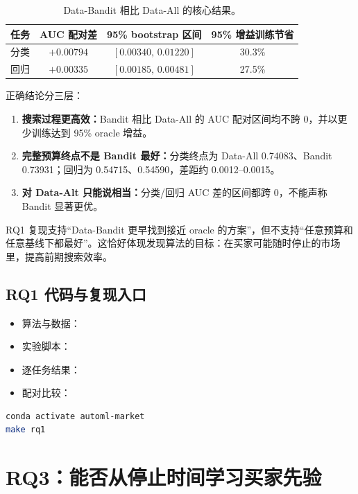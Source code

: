 \documentclass[11pt,a4paper]{ctexart}
\newcommand{\key}[1]{\textcolor{ZJUBlue}{\textbf{#1}}}
\newcommand{\good}[1]{\textcolor{ZJUGreen}{\textbf{#1}}}
\begin{document}
\begin{table}[H]
\centering
\caption{Data-Bandit 相比 Data-All 的核心结果。}
\begin{tabular}{lccc}
\toprule
任务 & AUC 配对差 & 95\% bootstrap 区间 & 95\% 增益训练节省\\
\midrule
分类 & $+0.00794$ & $[0.00340,\,0.01220]$ & 30.3\%\\
回归 & $+0.00335$ & $[0.00185,\,0.00481]$ & 27.5\%\\
\bottomrule
\end{tabular}
\end{table}

正确结论分三层：
\begin{enumerate}
  \item \good{搜索过程更高效：}Bandit 相比 Data-All 的 AUC 配对区间均不跨 0，并以更少训练达到 95\% oracle 增益。
  \item \key{完整预算终点不是 Bandit 最好：}分类终点为 Data-All 0.74083、Bandit 0.73931；回归为 0.54715、0.54590，差距约 0.0012--0.0015。
  \item \key{对 Data-Alt 只能说相当：}分类/回归 AUC 差的区间都跨 0，不能声称 Bandit 显著更优。
\end{enumerate}

\begin{takeaway}
RQ1 复现支持“Data-Bandit 更早找到接近 oracle 的方案”，但不支持“任意预算和任意基线下都最好”。这恰好体现发现算法的目标：在买家可能随时停止的市场里，提高前期搜索效率。
\end{takeaway}

\subsection{RQ1 代码与复现入口}
\begin{itemize}
  \item 算法与数据：
  \item 实验脚本：
  \item 逐任务结果：
  \item 配对比较：
\end{itemize}
\begin{lstlisting}[language=bash]
conda activate automl-market
make rq1
\end{lstlisting}

\section{RQ3：能否从停止时间学习买家先验}
\end{document}
